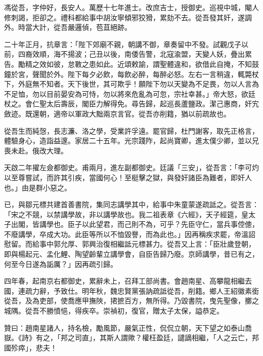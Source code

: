 \begin{pinyinscope}
馮從吾，字仲好，長安人。萬歷十七年進士。改庶吉士，授御史。巡視中城，閹人修刺謁，拒卻之。禮科都給事中胡汝寧傾邪狡猾，累劾不去。從吾發其奸，遂調外。時當大計，從吾嚴邏偵，苞苴絕跡。

二十年正月，抗章言：「陛下郊廟不親，朝講不御，章奏留中不發。試觀戊子以前，四裔效順，海不揚波；己丑以後，南倭告警，北寇渝盟，天變人妖，疊出累告。勵精之效如彼，怠斁之患如此。近頌敕諭，謂聖體違和，欲借此自掩，不知鼓鐘於宮，聲聞於外。陛下每夕必飲，每飲必醉，每醉必怒。左右一言稍違，輒斃杖下，外庭無不知者。天下後世，其可欺乎！願陛下勿以天變為不足畏，勿以人言為不足恤，勿以目前晏安為可恃，勿以將來危亂為可忽，宗社幸甚。」帝大怒，欲廷杖之。會仁聖太后壽辰，閣臣力解得免。尋告歸，起巡長蘆鹽政。潔己惠商，奸宄斂迹。既還朝，適帝以軍政大黜兩京言官。從吾亦削籍，猶以前疏故也。

從吾生而純愨，長志濂、洛之學，受業許孚遠。罷官歸，杜門謝客，取先正格言，體驗身心，造詣益邃。家居二十五年。光宗踐阼，起尚寶卿，進太僕少卿，並以兄喪未赴。俄改大理。

天啟二年擢左僉都御史。甫兩月，進左副都御史。廷議「三安」，從吾言：「李可灼以至尊嘗試，而許其引疾，當國何心！至梃擊之獄，與發奸諸臣為難者，即奸人也。」由是群小惡之。

已，與鄒元標共建首善書院，集同志講學其中，給事中朱童蒙遂疏詆之。從吾言：「宋之不競，以禁講學故，非以講學故也。我二祖表章《六經》，天子經筵，皇太子出閣，皆講學也。臣子以此望君，而己則不為，可乎？先臣守仁，當兵事倥傯，不廢講學，卒成大功。此臣等所以不恤毀譽，而為此也。」因再稱疾求罷，帝溫詔慰留。而給事中郭允厚、郭興治復相繼詆元標甚力。從吾又上言：「臣壯歲登朝，即與楊起元、孟化鯉、陶望齡輩立講學會，自臣告歸乃廢。京師講學，昔已有之，何至今日遂為詬厲？」因再疏引歸。

四年春，起南京右都御史，累辭未上，召拜工部尚書。會趙南星、高攀龍相繼去國，連疏力辭，予致仕。明年秋，魏忠賢黨張訥疏詆從吾，削籍。鄉人王紹徽素銜從吾，及為吏部，使喬應甲撫陜，捃摭百方，無所得。乃毀書院，曳先聖像，擲之城隅。從吾不勝憤悒，得疾卒。崇禎初，復官，贈太子太保，謚恭定。

贊曰：趙南星諸人，持名檢，勵風節，嚴氣正性，侃侃立朝，天下望之如泰山喬嶽。《詩》有之，「邦之司直」，其斯人謂歟？權枉盈廷，譴謫相繼，「人之云亡，邦國殄瘁」，悲夫！


\end{pinyinscope}